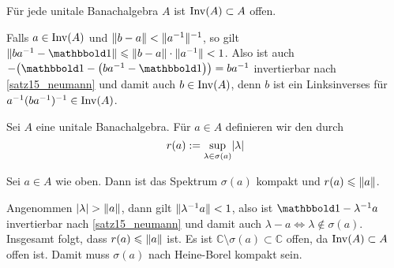 \begin{korollar}[{name=[Invertierbare Elemente bilden offene Menge]},label=inv_offen]
	Für jede unitale Banachalgebra $A$ ist $\operatorname{Inv}(A) \subset A$ offen.
\end{korollar}
\begin{beweis}
	Falls $a \in \operatorname{Inv}(A)$ und $\Vert b-a\Vert < \Vert a^{-1}\Vert^{-1}$, so gilt $\norm{b a^{-1} -\ind} \le \norm{b-a} \cdot \norm{a^{-1}}<1$.  Also ist auch
	$-\enbrace*{\ind- \enbrace*{ba^{-1} -\ind}} = ba^{-1}$ invertierbar nach \autoref{satz15_neumann} und damit auch $b \in \operatorname{Inv}(A)$, denn $b$ ist ein Linksinverses für 
	$a^{-1}(ba^{-1})^{-1} \in \operatorname{Inv}(A)$.
\end{beweis}

\begin{definition}[{name=[Spektralradius]}]
	Sei $A$ eine unitale Banachalgebra. Für $a \in A$ definieren wir den  durch
	\[
		r(a) := \sup_{\lambda \in \sigma(a)} \lvert\lambda\rvert 
	\] 
\end{definition}

\begin{proposition}[{name=[Spektrum ist kompakt und Spektralradius durch Norm beschränkt]},label=spec_kompakt]
	Sei $a \in A$ wie oben. Dann ist das Spektrum $\sigma(a)$ kompakt und $r(a) \leqslant \Vert a\Vert$.
\end{proposition}
\begin{beweis}
	Angenommen $\lvert\lambda\rvert > \Vert a\Vert$, dann gilt $\Vert\lambda^{-1} a\Vert < 1$, also ist $\ind- \lambda^{-1} a$ invertierbar nach \autoref{satz15_neumann} und 
	damit auch $\lambda -a \iff \lambda \notin \sigma(a)$. Insgesamt folgt, dass $r(a) \leqslant \Vert a\Vert$ ist. 	
	Es ist $\mathbb{C} \setminus \sigma(a) \subset \mathbb{C}$ offen, da $\operatorname{Inv}(A) \subset A$ offen ist. Damit muss $\sigma(a)$ nach Heine-Borel kompakt sein.
\end{beweis}

